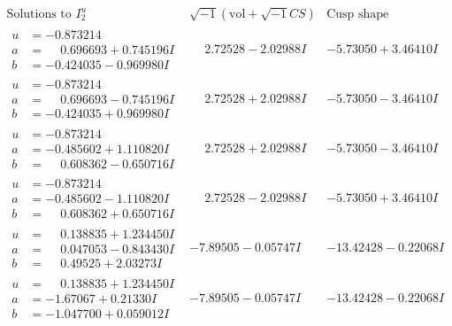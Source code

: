 \documentclass[1p]{elsarticle_modified}
\theoremstyle{definition}
\newcommand{\I}{\sqrt{-1}}
\begin{document}
$$\begin{array}{c|c|c}  
\text{Solutions to }I^u_{2}& \I (\text{vol} + \sqrt{-1}CS) & \text{Cusp shape}\\
 \hline 
\begin{aligned}
u &= -0.873214\phantom{ +0.000000I} \\
a &= \phantom{-}0.696693 + 0.745196 I \\
b &= -0.424035 - 0.969980 I\end{aligned}
 & \phantom{-}2.72528 - 2.02988 I & -5.73050 + 3.46410 I \\ \hline\begin{aligned}
u &= -0.873214\phantom{ +0.000000I} \\
a &= \phantom{-}0.696693 - 0.745196 I \\
b &= -0.424035 + 0.969980 I\end{aligned}
 & \phantom{-}2.72528 + 2.02988 I & -5.73050 - 3.46410 I \\ \hline\begin{aligned}
u &= -0.873214\phantom{ +0.000000I} \\
a &= -0.485602 + 1.110820 I \\
b &= \phantom{-}0.608362 - 0.650716 I\end{aligned}
 & \phantom{-}2.72528 + 2.02988 I & -5.73050 - 3.46410 I \\ \hline\begin{aligned}
u &= -0.873214\phantom{ +0.000000I} \\
a &= -0.485602 - 1.110820 I \\
b &= \phantom{-}0.608362 + 0.650716 I\end{aligned}
 & \phantom{-}2.72528 - 2.02988 I & -5.73050 + 3.46410 I \\ \hline\begin{aligned}
u &= \phantom{-}0.138835 + 1.234450 I \\
a &= \phantom{-}0.047053 - 0.843430 I \\
b &= \phantom{-}0.49525 + 2.03273 I\end{aligned}
 & -7.89505 - 0.05747 I & -13.42428 - 0.22068 I \\ \hline\begin{aligned}
u &= \phantom{-}0.138835 + 1.234450 I \\
a &= -1.67067 + 0.21330 I \\
b &= -1.047700 + 0.059012 I\end{aligned}
 & -7.89505 - 0.05747 I & -13.42428 - 0.22068 I \\ \hline\begin{aligned}

\end{aligned}
\end{array}$$
\end{document}
